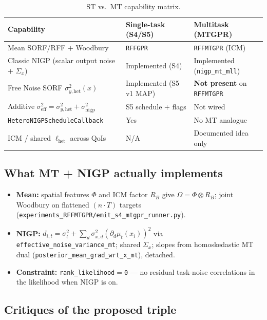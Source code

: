 \documentclass[11pt]{article}
\newcommand{\sighet}{\sigma_{y,\mathrm{het}}^{2}}
\newcommand{\signigp}{\sigma_{\mathrm{nigp}}^{2}}
\newcommand{\sigeff}{\sigma_{\mathrm{eff}}^{2}}
\newcommand{\Sigx}{\Sigma_{x}}
\begin{document}
\begin{table}[H]
\centering
\small
\begin{tabular}{@{}>{\raggedright\arraybackslash}p{4.0cm}
  >{\raggedright\arraybackslash}p{4.2cm}
  >{\raggedright\arraybackslash}p{4.2cm}@{}}
\toprule
\textbf{Capability} & \textbf{Single-task (S4/S5)} & \textbf{Multitask (MTGPR)} \\
\midrule
Mean SORF/RFF $+$ Woodbury
& \texttt{RFFGPR}
& \texttt{RFFMTGPR} (ICM) \\
Classic NIGP (scalar output noise $+$ $\Sigx$)
& Implemented (S4)
& Implemented (\texttt{nigp\_mt\_mll}) \\
Free Noise SORF $\sighet(x)$
& Implemented (S5 v1 MAP)
& \textbf{Not present} on \texttt{RFFMTGPR} \\
Additive $\sigeff=\sighet+\signigp$
& S5 schedule $+$ flags
& Not wired \\
\texttt{HeteroNIGPScheduleCallback}
& Yes
& No MT analogue \\
ICM / shared $\ell_{\mathrm{het}}$ across QoIs
& N/A
& Documented idea only \\
\bottomrule
\end{tabular}
\caption{ST vs.\ MT capability matrix.}
\label{tab:mt-cap}
\end{table}

\subsection{What MT + NIGP actually implements}

\begin{itemize}[leftmargin=1.2em,itemsep=0.35em]
  \item \textbf{Mean:} spatial features $\Phi$ and ICM factor $R_B$ give
        $\Omega=\Phi\otimes R_B$; joint Woodbury on flattened $(n\cdot T)$ targets
        (\texttt{experiments\_RFFMTGPR/emit\_s4\_mtgpr\_runner.py}).
  \item \textbf{NIGP:}
        $d_{i,t}=\sigma_{t}^{2}+\sum_{d}\sigma_{x,d}^{2}(\partial_{d}\mu_{t}(x_{i}))^{2}$
        via \texttt{effective\_noise\_variance\_mt}; shared $\Sigx$; slopes from
        homoskedastic MT dual (\texttt{posterior\_mean\_grad\_wrt\_x\_mt}), detached.
  \item \textbf{Constraint:} \texttt{rank\_likelihood$=$0} --- no residual
        task-noise correlations in the likelihood when NIGP is on.
\end{itemize}

\subsection{Critiques of the proposed triple}
\end{document}
